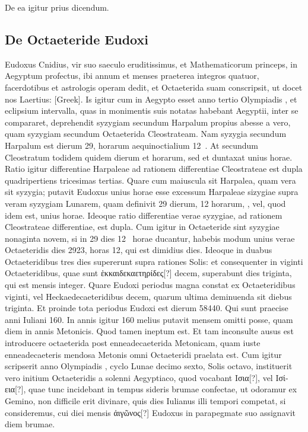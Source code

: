 De ea igitur prius dicendum.

\subsection{De Octaeteride Eudoxi}
Eudoxus Cnidius, vir suo saeculo eruditissimus, et Mathematicorum
princeps, in Aegyptum profectus, ibi annum et menses
praeterea integros quatuor, facerdotibus et astrologis operam dedit,
et Octaeterida suam conscripsit, ut docet nos Laertius: \textgreek{[Greek]}.
Is igitur cum in Aegypto
esset anno tertio Olympiadis , et eclipsium intervalla, quas in
monimentis suis notatas habebant Aegyptii, inter se compararet, deprehendit
syzygiam secundum Harpalum propius abesse a vero, quam
syzygiam secundum Octaeterida Cleostrateam.
Nam syzygia secundum
Harpalum est dierum 29, horarum aequinoctialium 12~.
At
secundum Cleostratum todidem quidem dierum et horarum, sed et 
duntaxat unius horae.
Ratio igitur differentiae Harpaleae ad rationem
differentiae Cleostrateae est dupla quadripertiens tricesimas tertias.
Quare cum maiuscula sit Harpalea, quam vera sit syzygia;
 putavit Eudoxus
 unius horae esse excessum Harpaleae sizygiae
 supra veram syzygiam
Lunarem, quam definivit 29 dierum, 12 horarum, , vel, quod
idem est,  unius horae.
Ideoque ratio differentiae verae syzygiae, ad rationem
Cleostrateae differentiae, est dupla.
Cum igitur in Octaeteride
sint syzygiae nonaginta novem, si in 29 dies 12~
 horae ducantur, habebis
modum unius verae Octaeteridis dies 2923, horas 12, qui est dimidius
dies.
Ideoque in duabus Octaeteridibus tres dies supererunt supra
rationes Solis: et consequenter in viginti Octaeteridibus, quae sunt
\textgreek{ἑκκαιδεκαετηρίδες[?]} decem, superabunt dies triginta,
 qui est mensis integer.
Quare Eudoxi periodus magna constat ex Octaeteridibus viginti,
vel Heckaedecaeteridibus decem, quarum ultima deminuenda sit
diebus triginta.
Et proinde tota periodus Eudoxi est dierum 58440.
Qui sunt praecise anni Iuliani 160.
In annis igitur 160 melius putavit
mensem omitti posse, quam diem in  annis Metonicis.
Quod tamen
ineptum est.
Et tam inconsulte ausus est introducere octaeterida
post enneadecaeterida Metonicam, quam iuste enneadecaeteris mendosa
Metonis omni Octaeteridi praelata est.
Cum igitur scripserit
anno  Olympiadis , cyclo Lunae decimo sexto,
 Solis octavo, instituerit
vero initium Octaeteridis a solenni Aegyptiaco, quod vocabant
\textgreek{Ισια[?]}, vel \textgreek{Ισίεια[?]}, quae tunc incidebant
 in tempus sideris brumae
confectae, ut odoramur ex Gemino, non difficile erit divinare, quis dies
Iulianus illi tempori competat, si consideremus, cui diei mensis
 \textgreek{ἀιγῶνος[?]}
Eudoxus in parapegmate suo assignavit diem brumae.

